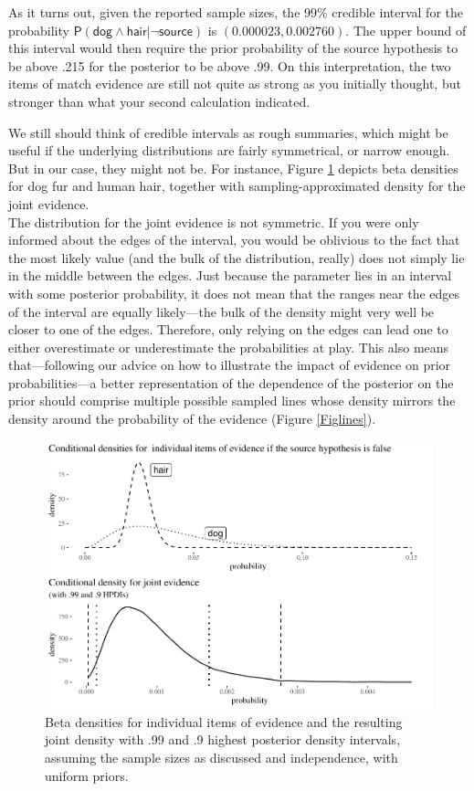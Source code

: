 \documentclass[
  10pt,
  dvipsnames,enabledeprecatedfontcommands]{scrartcl}
\newcommand{\s}[1]{\mbox{$\mathsf{#1}$}}
\begin{document}
As it turns out, given the reported sample sizes, the 99\% credible
interval for the probability
\(\mathsf{P}(\s{dog}\wedge \s{hair} \vert \neg \s{source})\) is
\((0.000023, 0.002760)\). The upper bound of this interval would then
require the prior probability of the source hypothesis to be above .215
for the posterior to be above .99. On this interpretation, the two items
of match evidence are still not quite as strong as you initially
thought, but stronger than what your second calculation indicated.

We still should think of credible intervals as rough summaries, which
might be useful if the underlying distributions are fairly symmetrical,
or narrow enough. But in our case, they might not be. For instance,
Figure \ref{Figdensities} depicts beta densities for dog fur and human
hair, together with sampling-approximated density for the joint
evidence.\\
The distribution for the joint evidence is not symmetric. If you were
only informed about the edges of the interval, you would be oblivious to
the fact that the most likely value (and the bulk of the distribution,
really) does not simply lie in the middle between the edges. Just
because the parameter lies in an interval with some posterior
probability, it does not mean that the ranges near the edges of the
interval are equally likely---the bulk of the density might very well be
closer to one of the edges. Therefore, only relying on the edges can
lead one to either overestimate or underestimate the probabilities at
play. This also means that---following our advice on how to illustrate
the impact of evidence on prior probabilities---a better representation
of the dependence of the posterior on the prior should comprise multiple
possible sampled lines whose density mirrors the density around the
probability of the evidence (Figure \ref{Figlines}).


\begin{figure}[H]

\begin{center}\includegraphics[width=0.8\linewidth]{imprecision_philosophical_paper2_files/figure-latex/Figdensities-1} \end{center}
\caption{Beta densities for individual items of evidence and the resulting joint density with .99 and .9 highest posterior density intervals, assuming the sample sizes as discussed and independence, with uniform priors.}
\label{Figdensities}
\end{figure}
\end{document}
